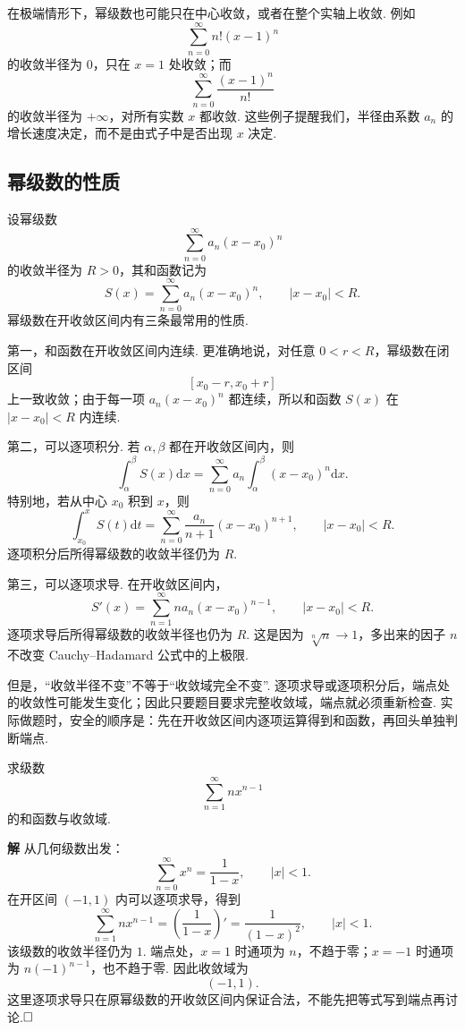 \documentclass{ctexart}
\newcommand{\dd}{\mathrm{d}}
\newenvironment{custom}[1]{\par\noindent \textbf{#1}\quad}{\par\vspace{1em}}
\begin{document}
在极端情形下，幂级数也可能只在中心收敛，或者在整个实轴上收敛. 例如
\[
\sum_{n=0}^{\infty}n!(x-1)^n
\]
的收敛半径为 $0$，只在 $x=1$ 处收敛；而
\[
\sum_{n=0}^{\infty}\frac{(x-1)^n}{n!}
\]
的收敛半径为 $+\infty$，对所有实数 $x$ 都收敛. 这些例子提醒我们，半径由系数 $a_n$ 的增长速度决定，而不是由式子中是否出现 $x$ 决定.

\subsection{幂级数的性质}

设幂级数
\[
\sum_{n=0}^{\infty}a_n(x-x_0)^n
\]
的收敛半径为 $R>0$，其和函数记为
\[
S(x)=\sum_{n=0}^{\infty}a_n(x-x_0)^n,
\qquad |x-x_0|<R.
\]
幂级数在开收敛区间内有三条最常用的性质.

第一，和函数在开收敛区间内连续. 更准确地说，对任意 $0<r<R$，幂级数在闭区间
\[
[x_0-r,x_0+r]
\]
上一致收敛；由于每一项 $a_n(x-x_0)^n$ 都连续，所以和函数 $S(x)$ 在 $|x-x_0|<R$ 内连续.

第二，可以逐项积分. 若 $\alpha,\beta$ 都在开收敛区间内，则
\[
\int_{\alpha}^{\beta}S(x)\dd x
=
\sum_{n=0}^{\infty}a_n\int_{\alpha}^{\beta}(x-x_0)^n\dd x.
\]
特别地，若从中心 $x_0$ 积到 $x$，则
\[
\int_{x_0}^{x}S(t)\dd t
=
\sum_{n=0}^{\infty}\frac{a_n}{n+1}(x-x_0)^{n+1},
\qquad |x-x_0|<R.
\]
逐项积分后所得幂级数的收敛半径仍为 $R$.

第三，可以逐项求导. 在开收敛区间内，
\[
S'(x)=\sum_{n=1}^{\infty}na_n(x-x_0)^{n-1},
\qquad |x-x_0|<R.
\]
逐项求导后所得幂级数的收敛半径也仍为 $R$. 这是因为 $\sqrt[n]{n}\to 1$，多出来的因子 $n$ 不改变 Cauchy--Hadamard 公式中的上极限.

但是，“收敛半径不变”不等于“收敛域完全不变”. 逐项求导或逐项积分后，端点处的收敛性可能发生变化；因此只要题目要求完整收敛域，端点就必须重新检查. 实际做题时，安全的顺序是：先在开收敛区间内逐项运算得到和函数，再回头单独判断端点.

\begin{example}
求级数
\[
\sum_{n=1}^{\infty}nx^{n-1}
\]
的和函数与收敛域.
\end{example}

\begin{custom}{解}
从几何级数出发：
\[
\sum_{n=0}^{\infty}x^n=\frac{1}{1-x},\qquad |x|<1.
\]
在开区间 $(-1,1)$ 内可以逐项求导，得到
\[
\sum_{n=1}^{\infty}nx^{n-1}
=\left(\frac{1}{1-x}\right)'
=\frac{1}{(1-x)^2},
\qquad |x|<1.
\]
该级数的收敛半径仍为 $1$. 端点处，$x=1$ 时通项为 $n$，不趋于零；$x=-1$ 时通项为 $n(-1)^{n-1}$，也不趋于零. 因此收敛域为
\[
(-1,1).
\]
这里逐项求导只在原幂级数的开收敛区间内保证合法，不能先把等式写到端点再讨论.$\hfill{\square}$
\end{custom}
\end{document}

